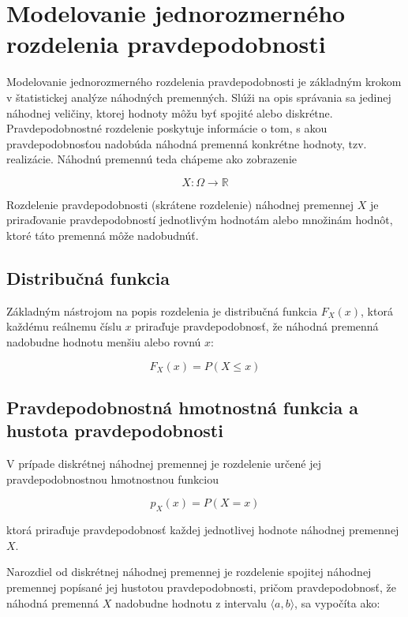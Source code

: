 \section{Modelovanie jednorozmerného rozdelenia pravdepodobnosti}\label{sec:1D_modelovanie}

Modelovanie jednorozmerného rozdelenia pravdepodobnosti je základným krokom v štatistickej analýze náhodných premenných. Slúži na opis správania sa jedinej náhodnej veličiny, ktorej hodnoty môžu byť spojité alebo diskrétne. Pravdepodobnostné rozdelenie poskytuje informácie o tom, s akou pravdepodobnosťou nadobúda náhodná premenná konkrétne hodnoty, tzv. realizácie. Náhodnú premennú teda chápeme ako zobrazenie 

\begin{equation}
X: \Omega \to \mathbb{R} 
\end{equation}

Rozdelenie pravdepodobnosti (skrátene rozdelenie) náhodnej premennej $X$ je priraďovanie pravdepodobností jednotlivým hodnotám alebo množinám hodnôt, ktoré táto premenná môže nadobudnúť.

\subsection{Distribučná funkcia}

Základným nástrojom na popis rozdelenia je distribučná funkcia $F_X(x)$, ktorá každému reálnemu číslu $x$ priraďuje pravdepodobnosť, že náhodná premenná nadobudne hodnotu menšiu alebo rovnú $x$: 

\begin{equation} 
F_X(x) = P(X \leq x) 
\end{equation} 

\subsection{Pravdepodobnostná hmotnostná funkcia a hustota pravdepodobnosti}

V prípade diskrétnej náhodnej premennej je rozdelenie určené jej pravdepodobnostnou hmotnostnou funkciou 

\begin{equation} 
p_X(x) = P(X = x) 
\end{equation} 

ktorá priraďuje pravdepodobnosť každej jednotlivej hodnote náhodnej premennej $X$.

Narozdiel od diskrétnej náhodnej premennej je rozdelenie spojitej náhodnej premennej popísané jej hustotou pravdepodobnosti, pričom pravdepodobnosť, že náhodná premenná $X$ nadobudne hodnotu z intervalu $\langle a, b \rangle$, sa vypočíta ako: 


